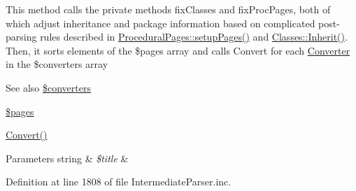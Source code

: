\-This method calls the private methods fix\-Classes and fix\-Proc\-Pages, both of which adjust inheritance and package information based on complicated post-\/parsing rules described in \hyperlink{class_procedural_pages_a6d4b1eff46ff8bd07e362a7c88c43da7}{\-Procedural\-Pages\-::setup\-Pages()} and \hyperlink{class_classes_ac40576cb234b55a55191a4fa3b9ed9da}{\-Classes\-::\-Inherit()}. \-Then, it sorts elements of the \$pages array and calls \-Convert for each \hyperlink{class_converter}{\-Converter} in the \$converters array \begin{DoxySeeAlso}{\-See also}
\hyperlink{classphp_documentor___intermediate_parser_a16c7db96cbf12e146fb962e69059975a}{\$converters} 

\hyperlink{classphp_documentor___intermediate_parser_a263621399c53f2952c2329ee13ad8e4e}{\$pages} 

\hyperlink{classphp_documentor___intermediate_parser_a37f8a580494f3b63d9ac6811fdda3d1e}{\-Convert()} 
\end{DoxySeeAlso}

\begin{DoxyParams}[1]{\-Parameters}
string & {\em \$title} & \\
\hline
\end{DoxyParams}


\-Definition at line 1808 of file \-Intermediate\-Parser.\-inc.


